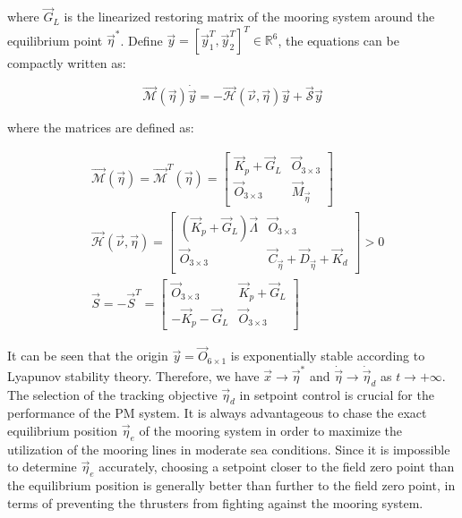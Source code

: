 \begin{sloppypar}
\noindent where $\vec{G}_L$ is the linearized restoring matrix of the mooring system around the equilibrium point $\vec{\eta}^*$. Define $\vec{y} = [\vec{y}_1^T, \vec{y}_2^T]^T\in\mathbb{R}^6$, the equations can be compactly written as:

\begin{equation}
\vec{\mathcal{M}}(\vec{\eta})\dot{\vec{y}} = -\vec{\mathcal{H}}(\vec{\nu}, \vec{\eta})\vec{y} + \vec{\mathcal{S}}\vec{y} 
\end{equation}

\noindent where the matrices are defined as:

\begin{align}
&\vec{\mathcal{M}}(\vec{\eta}) = \vec{\mathcal{M}}^T(\vec{\eta}) = \begin{bmatrix}
\vec{K}_p + \vec{G}_L & \vec{O}_{3\times3} \\
\vec{O}_{3\times3} & \vec{M}_{\vec{\eta}}
\end{bmatrix} \\
&\vec{\mathcal{H}}(\vec{\nu}, \vec{\eta}) = \begin{bmatrix}
(\vec{K}_p + \vec{G}_L)\vec{\Lambda} & \vec{O}_{3\times3} \\
\vec{O}_{3\times3} & \vec{C}_{\vec{\eta}} + \vec{D}_{\vec{\eta}} + \vec{K}_d
\end{bmatrix} > 0 \\
&\vec{S} = -\vec{S}^T = \begin{bmatrix}
\vec{O}_{3\times3} & \vec{K}_p + \vec{G}_L  \\
-\vec{K}_p - \vec{G}_L  & \vec{O}_{3\times3}
\end{bmatrix}
\end{align}

\noindent It can be seen that the origin $\vec{y} = \vec{O}_{6\times1}$ is exponentially stable according to Lyapunov stability theory. Therefore, we have $\vec{x} \to \vec{\eta}^*$ and $\dot{\vec{\eta}} \to \dot{\vec{\eta}}_d$ as $t \to +\infty$. The selection of the tracking objective $\vec{\eta}_d$ in setpoint control is crucial for the performance of the PM system. It is always advantageous to chase the exact equilibrium position $\vec{\eta}_e$ of the mooring system in order to maximize the utilization of the mooring lines in moderate sea conditions. Since it is impossible to determine $\vec{\eta}_e$ accurately, choosing a setpoint closer to the field zero point than the equilibrium position is generally better than further to the field zero point, in terms of preventing the thrusters from fighting against the mooring system.


\end{sloppypar}
